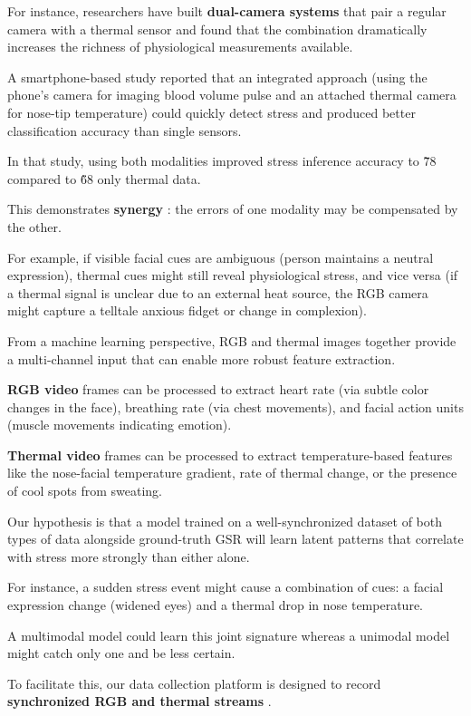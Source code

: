 For instance, researchers have built \textbf{dual-camera systems}
 that pair a regular camera with a thermal sensor and found that the combination
 dramatically increases the richness of physiological measurements available.

A smartphone-based study reported that an integrated approach (using the phone's
camera for imaging blood volume pulse and an attached thermal camera for nose-tip
temperature) could quickly detect stress and produced better classification accuracy
than single sensors.

In that study, using both modalities improved stress inference accuracy to \~78%
compared to \~68%
only thermal data.

This demonstrates \textbf{synergy}
: the errors of one modality may be compensated by the other.

For example, if visible facial cues are ambiguous (person maintains a neutral
expression), thermal cues might still reveal physiological stress, and vice versa (if
a thermal signal is unclear due to an external heat source, the RGB camera might
capture a telltale anxious fidget or change in complexion).

From a machine learning perspective, RGB and thermal images together provide a
multi-channel input that can enable more robust feature extraction.

\textbf{RGB video}
 frames can be processed to extract heart rate (via subtle color changes in the
 face), breathing rate (via chest movements), and facial action units (muscle
 movements indicating emotion).

\textbf{Thermal video}
 frames can be processed to extract temperature-based features like the nose-facial
 temperature gradient, rate of thermal change, or the presence of cool spots from
 sweating.

Our hypothesis is that a model trained on a well-synchronized dataset of both types
of data alongside ground-truth GSR will learn latent patterns that correlate with
stress more strongly than either alone.

For instance, a sudden stress event might cause a combination of cues: a facial
expression change (widened eyes) and a thermal drop in nose temperature.

A multimodal model could learn this joint signature whereas a unimodal model might
catch only one and be less certain.

To facilitate this, our data collection platform is designed to record
\textbf{synchronized RGB and thermal streams}
.

